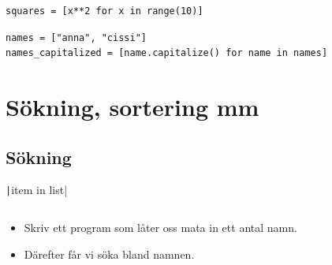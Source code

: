 \begin{frame}[fragile]
  \begin{example}
    \begin{verbatim}
squares = [x**2 for x in range(10)]
    \end{verbatim}
  \end{example}

  \pause

  \begin{example}
    \begin{verbatim}
names = ["anna", "cissi"]
names_capitalized = [name.capitalize() for name in names]
    \end{verbatim}
  \end{example}
\end{frame}


\section{Sökning, sortering mm}

\subsection{Sökning}

\begin{frame}[fragile]
  \texttt|item in list|
\end{frame}

\begin{frame}[fragile]
  \begin{example}[isin.py]
    \inputminted{python}{examples/isin.py}
  \end{example}
\end{frame}

\begin{frame}[fragile]
  \begin{exercise}[search.py]
    \begin{itemize}
      \item Skriv ett program som låter oss mata in ett antal 
        namn.
      \item Därefter får vi söka bland namnen.
    \end{itemize}
  \end{exercise}
\end{frame}

